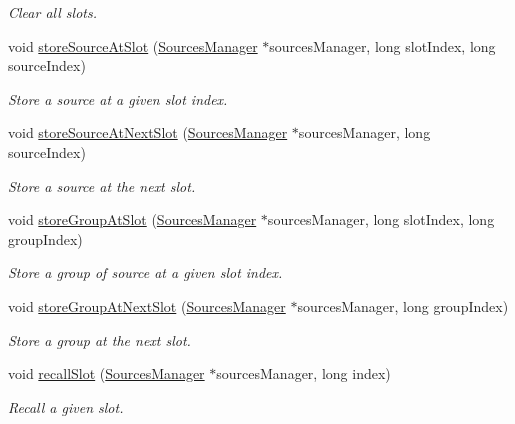 \begin{DoxyCompactItemize}
\begin{DoxyCompactList}\small\item\em Clear all slots. \end{DoxyCompactList}\item 
void \hyperlink{class_hoa2_d_1_1_sources_preset_add27861d6a85c0fc48d1bebcd85581d0}{store\-Source\-At\-Slot} (\hyperlink{class_hoa2_d_1_1_sources_manager}{Sources\-Manager} $\ast$sources\-Manager, long slot\-Index, long source\-Index)
\begin{DoxyCompactList}\small\item\em Store a source at a given slot index. \end{DoxyCompactList}\item 
void \hyperlink{class_hoa2_d_1_1_sources_preset_a21a0a63a4c668845f5c5a5d7c4738697}{store\-Source\-At\-Next\-Slot} (\hyperlink{class_hoa2_d_1_1_sources_manager}{Sources\-Manager} $\ast$sources\-Manager, long source\-Index)
\begin{DoxyCompactList}\small\item\em Store a source at the next slot. \end{DoxyCompactList}\item 
void \hyperlink{class_hoa2_d_1_1_sources_preset_a5c27b7ef613359eeac422f018d023147}{store\-Group\-At\-Slot} (\hyperlink{class_hoa2_d_1_1_sources_manager}{Sources\-Manager} $\ast$sources\-Manager, long slot\-Index, long group\-Index)
\begin{DoxyCompactList}\small\item\em Store a group of source at a given slot index. \end{DoxyCompactList}\item 
void \hyperlink{class_hoa2_d_1_1_sources_preset_a272fc71db53b8572932360352bd87b64}{store\-Group\-At\-Next\-Slot} (\hyperlink{class_hoa2_d_1_1_sources_manager}{Sources\-Manager} $\ast$sources\-Manager, long group\-Index)
\begin{DoxyCompactList}\small\item\em Store a group at the next slot. \end{DoxyCompactList}\item 
void \hyperlink{class_hoa2_d_1_1_sources_preset_aef5a6ad6bb221517235fbddf05de3e31}{recall\-Slot} (\hyperlink{class_hoa2_d_1_1_sources_manager}{Sources\-Manager} $\ast$sources\-Manager, long index)
\begin{DoxyCompactList}\small\item\em Recall a given slot. \end{DoxyCompactList}\item 

\end{DoxyCompactItemize}
